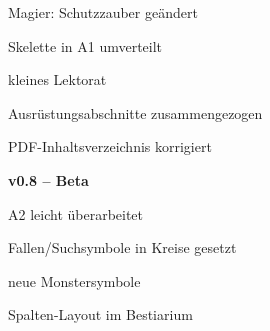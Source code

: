 {{		\item[A]  Magier: Schutzzauber geändert
		\item[M]  Skelette in A1 umverteilt
		\item[A]  kleines Lektorat
		\item[E]  Ausrüstungsabschnitte zusammengezogen
		\item[A]  PDF-Inhaltsverzeichnis korrigiert
		\item     \textbf{v0.8 -- Beta}
		\item[M]  A2 leicht überarbeitet
		\item[M]  Fallen/Suchsymbole in Kreise gesetzt
		\item[A]  neue Monstersymbole
		\item[L]  Spalten-Layout im Bestiarium

	}

}
